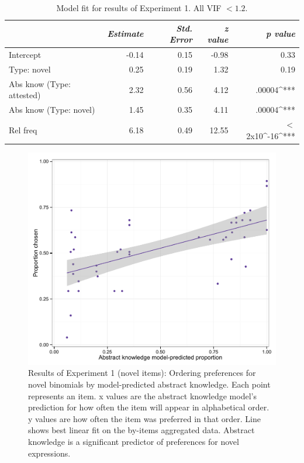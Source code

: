 \documentclass[authoryear]{elsarticle}
\begin{document}
\begin{table}[t]
\centering
\begin{tabular}{ l  r  r  r  r  }
\hline\hline
 & \emph{Estimate} &\emph{Std. Error} & \emph{z value} & \emph{p value} \\   \hline
Intercept     &       -0.14 &    0.15  & -0.98& 0.33    \\  
Type: novel       &          0.25   &  0.19 & 1.32 &0.19 \\  
Abs know  (Type: attested)    &   2.32   &  0.56  & 4.12 & .00004^{***} \\  
Abs know (Type: novel)   &1.45 &    0.35  & 4.11 &.00004^{***}    \\  
Rel freq    &      6.18   &  0.49 & 12.55 & $<$2x10^{-16}^{***}\\\hline  
\end{tabular}
\caption{Model fit for results of Experiment 1. All VIF $< 1.2$. }\label{t:fc-all}
\end{table}


\begin{figure}[t]
\includegraphics[scale=0.7]{fc-novel.pdf}
\caption{Results of Experiment 1 (novel items): Ordering preferences for novel binomials by model-predicted abstract knowledge. Each point represents an item. x values are the abstract knowledge model's prediction for how often the item will appear in alphabetical order. y values are how often the item was preferred in that order. Line shows best linear fit on the by-items aggregated data. Abstract knowledge is a significant predictor of preferences for novel expressions.} \label{fig:fc-abs}
\end{figure}
\end{document}
